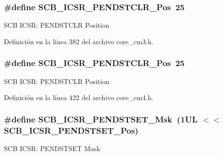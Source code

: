 \subsubsection[{\texorpdfstring{S\+C\+B\+\_\+\+I\+C\+S\+R\+\_\+\+P\+E\+N\+D\+S\+T\+C\+L\+R\+\_\+\+Pos}{SCB_ICSR_PENDSTCLR_Pos}}]{\setlength{\rightskip}{0pt plus 5cm}\#define S\+C\+B\+\_\+\+I\+C\+S\+R\+\_\+\+P\+E\+N\+D\+S\+T\+C\+L\+R\+\_\+\+Pos~25}\hypertarget{group___c_m_s_i_s___s_c_b_gadbe25e4b333ece1341beb1a740168fdc}{}\label{group___c_m_s_i_s___s_c_b_gadbe25e4b333ece1341beb1a740168fdc}
S\+CB I\+C\+SR\+: P\+E\+N\+D\+S\+T\+C\+LR Position 

Definición en la línea 382 del archivo core\+\_\+cm3.\+h.

\subsubsection[{\texorpdfstring{S\+C\+B\+\_\+\+I\+C\+S\+R\+\_\+\+P\+E\+N\+D\+S\+T\+C\+L\+R\+\_\+\+Pos}{SCB_ICSR_PENDSTCLR_Pos}}]{\setlength{\rightskip}{0pt plus 5cm}\#define S\+C\+B\+\_\+\+I\+C\+S\+R\+\_\+\+P\+E\+N\+D\+S\+T\+C\+L\+R\+\_\+\+Pos~25}\hypertarget{group___c_m_s_i_s___s_c_b_gadbe25e4b333ece1341beb1a740168fdc}{}\label{group___c_m_s_i_s___s_c_b_gadbe25e4b333ece1341beb1a740168fdc}
S\+CB I\+C\+SR\+: P\+E\+N\+D\+S\+T\+C\+LR Position 

Definición en la línea 422 del archivo core\+\_\+cm4.\+h.

\subsubsection[{\texorpdfstring{S\+C\+B\+\_\+\+I\+C\+S\+R\+\_\+\+P\+E\+N\+D\+S\+T\+S\+E\+T\+\_\+\+Msk}{SCB_ICSR_PENDSTSET_Msk}}]{\setlength{\rightskip}{0pt plus 5cm}\#define S\+C\+B\+\_\+\+I\+C\+S\+R\+\_\+\+P\+E\+N\+D\+S\+T\+S\+E\+T\+\_\+\+Msk~(1\+U\+L $<$$<$ S\+C\+B\+\_\+\+I\+C\+S\+R\+\_\+\+P\+E\+N\+D\+S\+T\+S\+E\+T\+\_\+\+Pos)}\hypertarget{group___c_m_s_i_s___s_c_b_ga7325b61ea0ec323ef2d5c893b112e546}{}\label{group___c_m_s_i_s___s_c_b_ga7325b61ea0ec323ef2d5c893b112e546}
S\+CB I\+C\+SR\+: P\+E\+N\+D\+S\+T\+S\+ET Mask 

